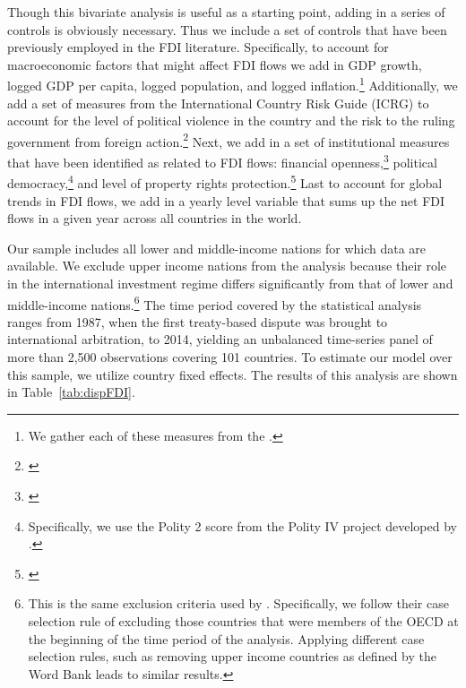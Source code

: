 \documentclass[12pt,onesided]{amsart}
\begin{document}
Though this bivariate analysis is useful as a starting point, adding in a series of controls is obviously necessary. Thus we include a set of controls that have been previously employed in the FDI literature. Specifically, to account for macroeconomic factors that might affect FDI flows we add in GDP growth, logged GDP per capita, logged population, and logged inflation.\footnote{We gather each of these measures from the \citet{worldbank:2013}.} Additionally, we add a set of measures from the International Country Risk Guide (ICRG) to account for the level of political violence in the country and the risk to the ruling government from foreign action.\footnote{\citet{prs:2013}} Next, we add in a set of institutional measures that have been identified as related to FDI flows: financial openness,\footnote{\citet{chinn:ito:2008}} political democracy,\footnote{Specifically, we use the Polity 2 score from the Polity IV project developed by \citet{marshall2013polity}.} and level of property rights protection.\footnote{\citet{prs:2013}} Last to account for global trends in FDI flows, we add in a yearly level variable that sums up the net FDI flows in a given year across all countries in the world.

Our sample includes all lower and middle-income nations for which data are available. We exclude upper income nations from the analysis because their role in the international investment regime differs significantly from that of lower and middle-income nations.\footnote{This is the same exclusion criteria used by \citet{allee:peinhardt:2011}. Specifically, we follow their case selection rule of excluding those countries that were members of the OECD at the beginning of the time period of the analysis. Applying different case selection rules, such as removing upper income countries as defined by the Word Bank leads to similar results.} The time period covered by the statistical analysis ranges from 1987, when the first treaty-based dispute was brought to international arbitration, to 2014, yielding an unbalanced time-series panel of more than 2,500 observations covering 101 countries. To estimate our model over this sample, we utilize country fixed effects. The results of this analysis are shown in Table~\ref{tab:dispFDI}.
\end{document}
